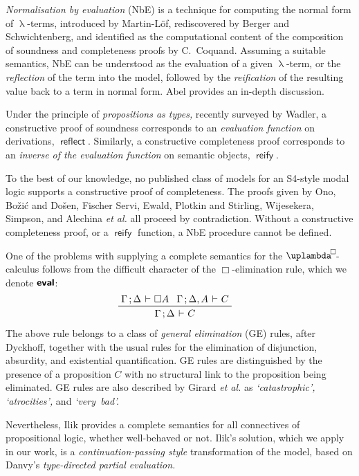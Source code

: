 \documentclass[submission,copyright,creativecommons,sharealike,backref=page]{eptcs}
\newcommand{\uplambdabox}{\uplambda^{\mkern-3mu\Box\mkern-3mu}}
\renewcommand{\:}{\mathop{\mkern3mu:\mkern3mu}}
\renewcommand{\.}{\mathop{\mkern3mu.\mkern3mu}}
\renewcommand{\;}{\mathop{;}}
\renewcommand{\,}{\mathop{,}}
\newcommand{\e}{\mathrel{\mkern2mu\vdash\mkern1mu}}
\newcommand{\reflect}{\operatorname{\textsf{reflect}}}
\newcommand{\reify}{\operatorname{\textsf{reify}}}
\newcommand{\eval}{\operatorname{\textsf{\textbf{eval}}}}
\theoremstyle{mystyle}
\begin{document}
\emph{Normalisation by evaluation} (NbE) is a technique for computing the normal form of $\uplambda$-terms, introduced by Martin-L{\"o}f\cite{MartinLof75}, rediscovered by Berger and Schwichtenberg\cite{BergerS91}, and identified as the computational content of the composition of soundness and completeness proofs by C.~Coquand\cite{Coquand93}.  Assuming a suitable semantics, NbE can be understood as the evaluation of a given $\uplambda$-term, or the \emph{reflection} of the term into the model, followed by the \emph{reification} of the resulting value back to a term in normal form.  Abel\cite{Abel13} provides an in-depth discussion.

Under the principle of \emph{propositions as types,} recently surveyed by Wadler\cite{Wadler15}, a constructive proof of soundness corresponds to an \emph{evaluation function} on derivations, $\reflect$.  Similarly, a constructive completeness proof corresponds to an \emph{inverse of the evaluation function} on semantic objects, $\reify$.

To the best of our knowledge, no published class of models for an S4-style modal logic supports a constructive proof of completeness.  The proofs given by Ono\cite{Ono77}, Bo\v{z}i\'{c} and Do\v{s}en\cite{BozicD84}, Fischer Servi\cite{FischerServi84}, Ewald\cite{Ewald86}, Plotkin and Stirling\cite{PlotkinS86}, Wijesekera\cite{Wijesekera90}, Simpson\cite{Simpson94}, and Alechina \emph{et al.}\cite{AlechinaMPR01} all proceed by contradiction.  Without a constructive completeness proof, or a $\reify$ function, a NbE procedure cannot be defined.

One of the problems with supplying a complete semantics for the $\uplambdabox$-calculus follows from the difficult character of the $\Box$-elimination rule, which we denote $\eval$:
\begin{align*}
  & \prftree
     {\Gamma \; \Delta \e \Box A}{\Gamma \; \Delta, A \e C}
     {\Gamma \; \Delta \e C}
\end{align*}
The above rule belongs to a class of \emph{general elimination} (GE) rules, after Dyckhoff\cite{Dyckhoff16}, together with the usual rules for the elimination of disjunction, absurdity, and existential quantification.  GE rules are distinguished by the presence of a proposition $C$ with no structural link to the proposition being eliminated.  GE rules are also described by Girard \emph{et al.}\cite{GirardTL89} as \textsl{`catastrophic', `atrocities',} and \textsl{`very~bad'.}

Nevertheless, Ilik\cite{Ilik13} provides a complete semantics for all connectives of propositional logic, whether well-behaved or not.  Ilik's solution, which we apply in our work, is a \emph{continuation-passing style} transformation of the model, based on Danvy's\cite{Danvy96} \emph{type-directed partial evaluation.}
\end{document}
